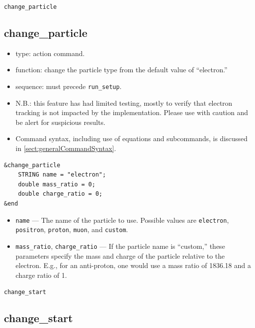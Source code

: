 \documentclass[11pt]{article}
\begin{document}
\newpage
\begin{center}{\Large\verb|change_particle|}\end{center}
\subsection{change\_particle\label{subsec:changeparticle}}

\begin{itemize}
\item type: action command.
\item function: change the particle type from the default value of ``electron.''
\item sequence: must precede \verb|run_setup|.
\item N.B.: this feature has had limited testing, mostly to verify that electron tracking is not
 impacted by the implementation.  Please use with caution and be alert for suspicious results.
\item Command syntax, including use of equations and subcommands, is discussed in \ref{sect:generalCommandSyntax}.
\end{itemize}

\begin{verbatim}
&change_particle
    STRING name = "electron";
    double mass_ratio = 0;
    double charge_ratio = 0;
&end
\end{verbatim}

\begin{itemize}
\item \verb|name| --- The name of the particle to use.  Possible values are \verb|electron|, \verb|positron|,
  \verb|proton|, \verb|muon|, and \verb|custom|.
\item \verb|mass_ratio|, \verb|charge_ratio| --- If the particle name is ``custom,'' these parameters specify the
  mass and charge of the particle relative to the electron.  E.g., for an anti-proton, one would use
  a mass ratio of 1836.18 and a charge ratio of 1.
\end{itemize}

\newpage
\begin{center}{\Large\verb|change_start|}\end{center}
\subsection{change\_start\label{subsec:changestart}}
\end{document}
